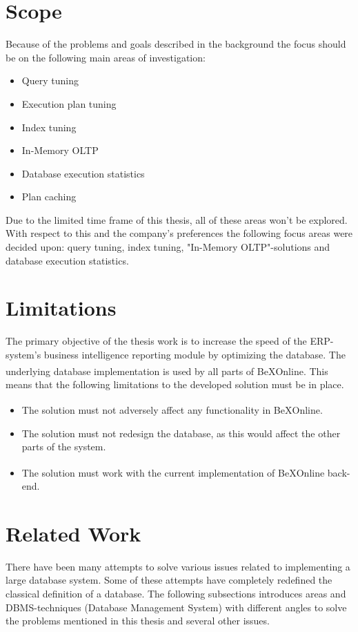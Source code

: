 \documentclass{cslthse-msc}
\newcommand{\bex}{BeX\textsuperscript{\textregistered}}
\begin{document}
\section{Scope} \label{sec:scope}
Because of the problems and goals described in the background the focus should be on the following main areas of investigation:
\begin{itemize}
\item Query tuning
\item Execution plan tuning
\item Index tuning
\item In-Memory OLTP
\item Database execution statistics
\item Plan caching
\end{itemize}
Due to the limited time frame of this thesis, all of these areas won't be explored. With respect to this and the company's preferences the following focus areas were decided upon: query tuning, index tuning, "In-Memory OLTP"-solutions and database execution statistics.

\section{Limitations}\label{sec:limi}
The primary objective of the thesis work is to increase the speed of the ERP-system's business intelligence reporting module by optimizing the database. The underlying database implementation is used by all parts of \bex Online. This means that the following limitations to the developed solution must be in place.

\begin{itemize}
\item The solution must not adversely affect any functionality in \bex Online.
\item The solution must not redesign the database, as this would affect the other parts of the system.
\item The solution must work with the current implementation of \bex Online back-end.
\end{itemize}

\section{Related Work}\label{sec:related}
There have been many attempts to solve various issues related to implementing a large database system. Some of these attempts have completely redefined the classical definition of a database. The following subsections introduces areas and DBMS-techniques (Database Management System) with different angles to solve the problems mentioned in this thesis and several other issues.
\end{document}
